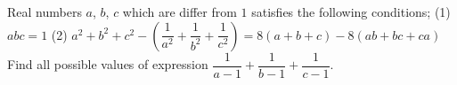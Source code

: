 Real numbers $a$, $b$, $c$ which are differ from $1$ satisfies the following conditions;
(1) $abc =1$
(2) $a^2+b^2+c^2 - \left( \dfrac{1}{a^2} + \dfrac{1}{b^2} + \dfrac{1}{c^2} \right) = 8(a+b+c) - 8 (ab+bc+ca)$
Find all possible values of expression $\dfrac{1}{a-1} + \dfrac{1}{b-1} + \dfrac{1}{c-1}$.
